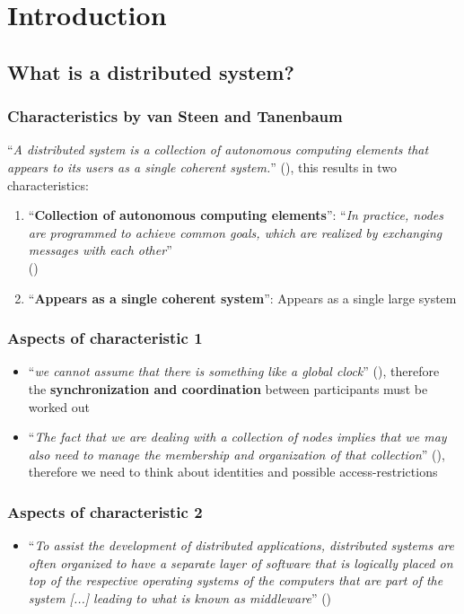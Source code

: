 \documentclass[12pt,A4]{extarticle}
\begin{document}
\disclaimer

\tableofcontents
\clearpage

\section{Introduction}
\subsection{What is a distributed system?}
\subsubsection{Characteristics by van Steen and Tanenbaum}
``\textit{A distributed system is a collection of autonomous computing elements that appears to its users as a single coherent system.}'' (\cite{DBLP:journals/computing/SteenT16}), this results in two characteristics:
\begin{enumerate}
  \item{``\textbf{Collection of autonomous computing elements}'': ``\textit{In practice, nodes are programmed to achieve common goals, which are realized by exchanging messages with each other}'' \\(\cite{DBLP:journals/computing/SteenT16})}
  \item{``\textbf{Appears as a single coherent system}'': Appears as a single large system}
\end{enumerate}

\subsubsection{Aspects of characteristic 1}
\begin{itemize}
  \item{``\textit{we cannot assume that there is something like a global clock}'' (\cite{DBLP:journals/computing/SteenT16}), therefore the \textbf{synchronization and coordination} between participants must be worked out}
  \item{``\textit{The fact that we are dealing with a collection of nodes implies that we may also need to manage the membership and organization of that collection}'' (\cite{DBLP:journals/computing/SteenT16}), therefore we need to think about identities and possible access-restrictions}
\end{itemize}

\subsubsection{Aspects of characteristic 2}
\begin{itemize}
  \item{``\textit{To assist the development of distributed applications, distributed systems are often organized to have a separate layer of software that is logically placed on top of the respective operating systems of the computers that are part of the system [...] leading to what is known as middleware}'' (\cite{DBLP:journals/computing/SteenT16})}
\end{itemize}
\end{document}
